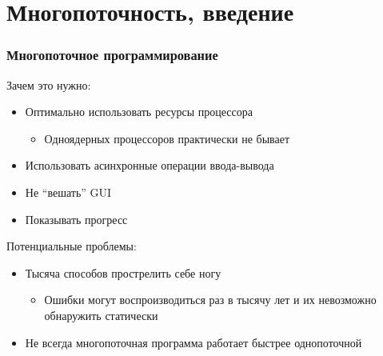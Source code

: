 \documentclass[xetex,mathserif,serif]{beamer}
\begin{document}
    \section{Многопоточность, введение}

    \begin{frame}
        \frametitle{Многопоточное программирование}
        Зачем это нужно:
        \begin{itemize}
            \item Оптимально использовать ресурсы процессора
            \begin{itemize}
                \item Одноядерных процессоров практически не бывает
            \end{itemize}
            \item Использовать асинхронные операции ввода-вывода
            \item Не ``вешать'' GUI
            \item Показывать прогресс
        \end{itemize}
        \vspace{5mm}
        Потенциальные проблемы:
        \begin{itemize}
            \item Тысяча способов прострелить себе ногу
            \begin{itemize}
                \item Ошибки могут воспроизводиться раз в тысячу лет и их невозможно обнаружить статически
            \end{itemize}
            \item Не всегда многопоточная программа работает быстрее однопоточной
        \end{itemize}
    \end{frame}
\end{document}
